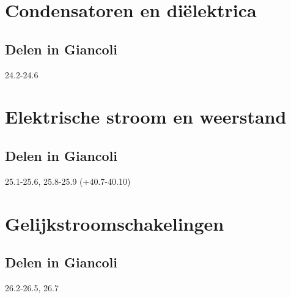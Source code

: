\documentclass[12pt,a4paper]{article}
\begin{document}
    \section{Condensatoren en diëlektrica}

    \subsection{Delen in Giancoli}
    24.2-24.6


    \section{Elektrische stroom en weerstand}

    \subsection{Delen in Giancoli}
    25.1-25.6, 25.8-25.9 (+40.7-40.10)


    \section{Gelijkstroomschakelingen}

    \subsection{Delen in Giancoli}
    26.2-26.5, 26.7
    
    
\end{document}
